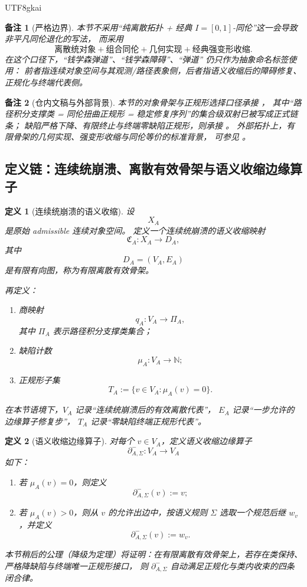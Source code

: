 \documentclass[12pt]{article}
\newtheorem{definition}{定义}[section]
\newtheorem{remark}{备注}[section]
\newcommand{\NN}{\mathbb{N}}
\begin{document}
\begin{CJK*}{UTF8}{gkai}
\begin{remark}[严格边界]
本节不采用“纯离散拓扑 + 经典 \(I=[0,1]\)-同伦”这一会导致非平凡同伦退化的写法，
而采用
\[
  \boxed{
    \text{离散统对象}
    +\text{组合同伦}
    +\text{几何实现}
    +\text{经典强变形收缩}
  }.
\]
在这个口径下，``钱学森弹道''、``钱学森障碍''、``弹道'' 仍只作为抽象命名标签使用：
前者指连续对象空间与其观测/路径表象侧，后者指语义收缩后的障碍修复、正规化与终端代表侧。
\end{remark}

\begin{remark}[仓内文稿与外部背景]
本节的对象骨架与正规形选择口径承接 \cite{RepoTex36HomotopyTwistEquivalence}，
其中“路径积分支撑类 = 同伦扭曲正规形 = 稳定修复序列”的集合级双射已被写成正式链条；
缺陷严格下降、有限终止与终端零缺陷正规形，则承接
\cite{RepoTex38JacobiBianchiRepair}。
外部拓扑上，有限骨架的几何实现、强变形收缩与同伦等价的标准背景，
可参见 \cite{Hatcher2002AT,Husemoller1994FibreBundles}。
\end{remark}

\subsection{定义链：连续统崩溃、离散有效骨架与语义收缩边缘算子}
\label{subsec:tex1-ch9-defs}

\begin{definition}[连续统崩溃的语义收缩]
\label{def:tex1-ch9-collapse}
设
\[
  X_A
\]
是原始 admissible 连续对象空间。
定义一个连续统崩溃的语义收缩映射
\[
  \mathfrak C_A:X_A\to D_A,
\]
其中
\[
  D_A=(V_A,E_A)
\]
是有限有向图，称为\emph{有限离散有效骨架}。

再定义：
\begin{enumerate}
  \item 商映射
  \[
    q_A:V_A\to \Pi_A,
  \]
  其中 \(\Pi_A\) 表示路径积分支撑类集合；
  \item 缺陷计数
  \[
    \mu_A:V_A\to \NN;
  \]
  \item 正规形子集
  \[
    T_A:=\{v\in V_A:\mu_A(v)=0\}.
  \]
\end{enumerate}
在本节语境下，\(V_A\) 记录“连续统崩溃后的有效离散代表”，
\(E_A\) 记录“一步允许的边缘算子修复步”，
\(T_A\) 记录“零缺陷终端正规形代表”。
\end{definition}

\begin{definition}[语义收缩边缘算子]
\label{def:tex1-ch9-operator}
对每个 \(v\in V_A\)，定义语义收缩边缘算子
\[
  \partial^-_{A,\Sigma}:V_A\to V_A
\]
如下：
\begin{enumerate}
  \item 若 \(\mu_A(v)=0\)，则定义
  \[
    \partial^-_{A,\Sigma}(v):=v;
  \]
  \item 若 \(\mu_A(v)>0\)，则从 \(v\) 的允许出边中，按语义规则 \(\Sigma\) 选取一个规范后继 \(w_v\)，并定义
  \[
    \partial^-_{A,\Sigma}(v):=w_v.
  \]
\end{enumerate}
本节稍后的公理（降级为定理）将证明：在有限离散有效骨架上，若存在类保持、严格降缺陷与终端唯一正规形接口，
则 \(\partial^-_{A,\Sigma}\) 自动满足正规化与类内收束的四条闭合律。
\end{definition}


\end{CJK*}
\end{document}
